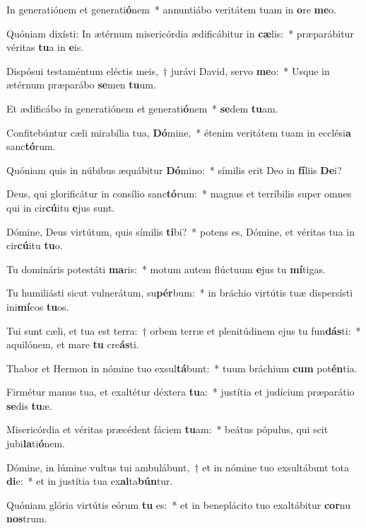 \item In generatiónem et generati\textbf{ó}nem~* annuntiábo veritátem tuam in \textbf{o}re \textbf{me}o.
\item Quóniam dixísti: In ætérnum misericórdia ædificábitur in \textbf{cæ}lis:~* præparábitur véritas \textbf{tu}a in \textbf{e}is.
\item Dispósui testaméntum eléctis meis,~† jurávi David, servo \textbf{me}o:~* Usque in ætérnum præparábo \textbf{se}men \textbf{tu}um.
\item Et ædificábo in generatiónem et generati\textbf{ó}nem~* \textbf{se}dem \textbf{tu}am.
\item Confitebúntur cæli mirabília tua, \textbf{Dó}mine,~* étenim veritátem tuam in ecclési\textbf{a} sanc\textbf{tó}rum.
\item Quóniam quis in núbibus æquábitur \textbf{Dó}mino:~* símilis erit Deo in \textbf{fí}liis \textbf{De}i?
\item Deus, qui glorificátur in consílio sanc\textbf{tó}rum:~* magnus et terríbilis super omnes qui in cir\textbf{cú}itu \textbf{e}jus sunt.
\item Dómine, Deus virtútum, quis símilis \textbf{ti}bi?~* potens es, Dómine, et véritas tua in cir\textbf{cú}itu \textbf{tu}o.
\item Tu domináris potestáti \textbf{ma}ris:~* motum autem flúctuum \textbf{e}jus tu \textbf{mí}tigas.
\item Tu humiliásti sicut vulnerátum, su\textbf{pér}bum:~* in bráchio virtútis tuæ dispersísti ini\textbf{mí}cos \textbf{tu}os.
\item Tui sunt cæli, et tua est terra:~† orbem terræ et plenitúdinem ejus tu fun\textbf{dás}ti:~* aquilónem, et mare \textbf{tu} cre\textbf{ás}ti.
\item Thabor et Hermon in nómine tuo exsul\textbf{tá}bunt:~* tuum bráchium \textbf{cum} pot\textbf{én}tia.
\item Firmétur manus tua, et exaltétur déxtera \textbf{tu}a:~* justítia et judícium præparátio \textbf{se}dis \textbf{tu}æ.
\item Misericórdia et véritas præcédent fáciem \textbf{tu}am:~* beátus pópulus, qui scit jubi\textbf{la}ti\textbf{ó}nem.
\item Dómine, in lúmine vultus tui ambulábunt,~† et in nómine tuo exsultábunt tota \textbf{di}e:~* et in justítia tua ex\textbf{al}ta\textbf{bún}tur.
\item Quóniam glória virtútis eórum \textbf{tu} es:~* et in beneplácito tuo exaltábitur \textbf{cor}nu \textbf{nos}trum.
